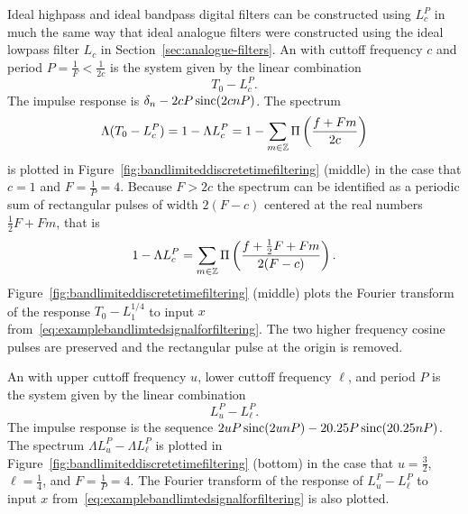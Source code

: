 Ideal highpass and ideal bandpass digital filters can be constructed using $L_c^P$ in much the same way that ideal analogue filters were constructed using the ideal lowpass filter $L_c$ in Section~\ref{sec:analogue-filters}.  An  with cuttoff frequency $c$ and period $P = \tfrac{1}{F} < \tfrac{1}{2c}$ is the system given by the linear combination 
\[
T_0 - L_c^{P}.
\]  
The impulse response is $\delta_n - 2cP\operatorname{sinc}(2cnP)$.  The spectrum 
\[
\Lambda (T_0 - L_c^P) = 1 - \Lambda L_c^{P} = 1 - \sum_{m \in {\mathbb Z}} \Pi\left( \frac{f + Fm}{2c}\right)
\]
is plotted in Figure~\ref{fig:bandlimiteddiscretetimefiltering} (middle) in the case that $c = 1$ and $F = \tfrac{1}{P} = 4$.  Because $F > 2c$ the spectrum can be identified as a periodic sum of rectangular pulses of width $2(F-c)$ centered at the real numbers $\tfrac{1}{2}F + Fm$, that is
\[
1 - \Lambda L_c^{P} = \sum_{m \in {\mathbb Z}} \Pi\left( \frac{f + \tfrac{1}{2}F + Fm}{2(F-c)}  \right).
\]  
Figure~\ref{fig:bandlimiteddiscretetimefiltering} (middle) plots the Fourier transform of the response $T_0 - L_1^{1/4}$ to input $x$ from~\ref{eq:examplebandlimtedsignalforfiltering}.  The two higher frequency cosine pulses are preserved and the rectangular pulse at the origin is removed.  

An  with upper cuttoff frequency $u$, lower cuttoff frequency $\ell$, and period $P$ is the system given by the linear combination 
\[
L_u^P - L_\ell^P.
\]  
The impulse response is the sequence $2uP\operatorname{sinc}(2unP) -  2 0.25 P\operatorname{sinc}(20.25 nP)$.  The spectrum $\Lambda L_u^P - \Lambda L_\ell^P$ is plotted in Figure~\ref{fig:bandlimiteddiscretetimefiltering} (bottom) in the case that $u = \tfrac{3}{2}$, $\ell = \tfrac{1}{4}$, and $F = \tfrac{1}{P} = 4$.  The Fourier transform of the response of $L_u^P - L_\ell^P$ to input $x$ from~\eqref{eq:examplebandlimtedsignalforfiltering} is also plotted.

